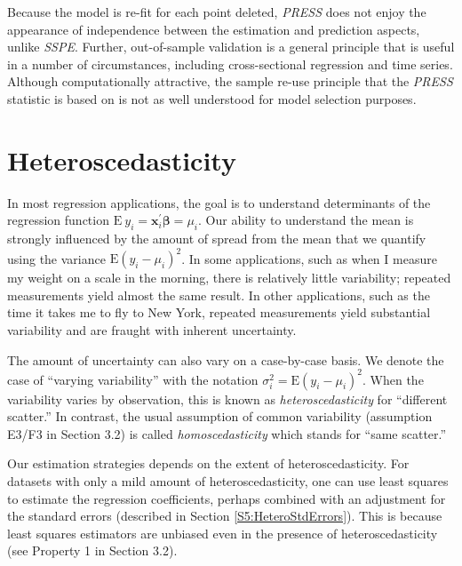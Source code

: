 Because the model is re-fit for each point deleted, \textit{PRESS}
does not enjoy the appearance of independence between the estimation
and prediction aspects, unlike \textit{SSPE}. Further, out-of-sample
validation is a general principle that is useful in a number of
circumstances, including cross-sectional regression and time series.
Although computationally attractive, the sample re-use principle
that the \textit{PRESS} statistic is based on is not as well
understood for model selection purposes.



\section{Heteroscedasticity}\label{S5:Heteroscedasticity}

In most regression applications, the goal is to understand
determinants of the regression function $\mathrm{E~}y_i =
\mathbf{x}_i^{\prime} \boldsymbol \beta =\mu_i$. Our ability to
understand the mean is strongly influenced by the amount of spread
from the mean that we quantify using the variance
$\mathrm{E}\left(y_i-\mu_i\right)^2$. In some applications, such as
when I measure my weight on a scale in the morning, there is
relatively little variability; repeated measurements yield almost
the same result. In other applications, such as the time it takes me
to fly to New York, repeated measurements yield substantial
variability and are fraught with inherent uncertainty.

The amount of uncertainty can also vary on a case-by-case basis. We
denote the case of ``varying variability'' with the notation
$\sigma_i^2=\mathrm{E}\left(y_i-\mu_i\right)^2$. When the
variability varies by observation, this is known as
\emph{heteroscedasticity} for ``different scatter.''  In contrast,
the usual assumption of common variability (assumption E3/F3 in
Section 3.2) is called \textit{homoscedasticity} which stands for
``same scatter.''

Our estimation strategies depends on the extent of
heteroscedasticity. For datasets with only a mild amount of
heteroscedasticity, one can use least squares to estimate the
regression coefficients, perhaps combined with an adjustment for the
standard errors (described in Section \ref{S5:HeteroStdErrors}).
This is because least squares estimators are unbiased even in the
presence of heteroscedasticity (see Property 1 in Section 3.2).

